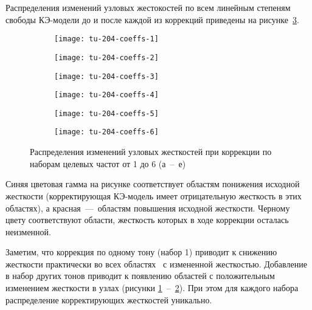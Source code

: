 Распределения изменений узловых жестокостей по всем линейным степеням свободы КЭ-модели до и после каждой из коррекций
приведены на рисунке~\ref{fig:tu-204-coeffs}.

\def\sfTu204Dist{0.4\textwidth}

\begin{figure}[H]
	\centering
	\begin{subfigure}[b]{\sfTu204Dist}
		\texttt{[image: tu-204-coeffs-1]}
		\caption{} \label{subfig:tu-204-coeffs-1}
	\end{subfigure}
	\begin{subfigure}[b]{\sfTu204Dist}
		\texttt{[image: tu-204-coeffs-2]}
		\caption{}
	\end{subfigure}
	\begin{subfigure}[b]{\sfTu204Dist}
		\texttt{[image: tu-204-coeffs-3]}
		\caption{}
	\end{subfigure}	
	\begin{subfigure}[b]{\sfTu204Dist}
		\texttt{[image: tu-204-coeffs-4]}
		\caption{}
	\end{subfigure}	
	\begin{subfigure}[b]{\sfTu204Dist}
		\texttt{[image: tu-204-coeffs-5]}
		\caption{}
	\end{subfigure}
	\begin{subfigure}[b]{\sfTu204Dist}
		\texttt{[image: tu-204-coeffs-6]}
		\caption{} \label{subfig:tu-204-coeffs-6}
	\end{subfigure}
	\caption{Распределения изменений узловых жесткостей при коррекции по наборам целевых частот от 1 до 6 (а~--~е)} \label{fig:tu-204-coeffs}
\end{figure}

Синяя цветовая гамма на рисунке соответствует областям понижения исходной жесткости (корректирующая КЭ-модель имеет отрицательную жесткость в этих областях), а красная~---~областям повышения исходной жесткости. Черному цвету соответствуют области, жесткость которых в ходе коррекции осталась неизменной.

Заметим, что коррекция по одному тону (набор 1) приводит к снижению жесткости практически во всех областях~ с измененной жесткостью. Добавление в набор других тонов приводит к появлению областей с положительным изменением жесткости в узлах (рисунки \ref{subfig:tu-204-coeffs-1}~--~\ref{subfig:tu-204-coeffs-6}). При этом для каждого набора распределение корректирующих жесткостей уникально.

